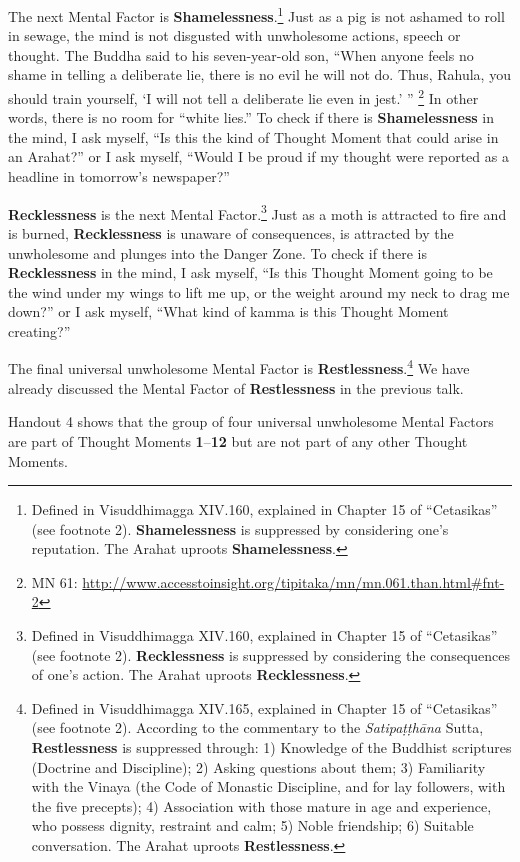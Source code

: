 The next Mental Factor is \textbf{Shamelessness}.\footnote{Defined in Visuddhimagga XIV.160, explained in Chapter 15 of “Cetasikas” (see footnote 2). \textbf{Shamelessness} is suppressed by considering one’s reputation. The Arahat uproots \textbf{Shamelessness}.} Just as a pig is not ashamed to roll in sewage, the mind is not disgusted with unwholesome actions, speech or thought. The Buddha said to his seven-year-old son, “When anyone feels no shame in telling a deliberate lie, there is no evil he will not do. Thus, Rahula, you should train yourself, `I will not tell a deliberate lie even in jest.’ ” \footnote{MN 61: \url{http://www.accesstoinsight.org/tipitaka/mn/mn.061.than.html\#fnt-2}} In other words, there is no room for “white lies.” To check if there is \textbf{Shamelessness} in the mind, I ask myself, “Is this the kind of Thought Moment that could arise in an Arahat?” or I ask myself, “Would I be proud if my thought were reported as a headline in tomorrow’s newspaper?”

\textbf{Recklessness} is the next Mental Factor.\footnote{Defined in Visuddhimagga XIV.160, explained in Chapter 15 of “Cetasikas” (see footnote 2). \textbf{Recklessness} is suppressed by considering the consequences of one’s action. The Arahat uproots \textbf{Recklessness}.} Just as a moth is attracted to fire and is burned, \textbf{Recklessness} is unaware of consequences, is attracted by the unwholesome and plunges into the Danger Zone. To check if there is \textbf{Recklessness} in the mind, I ask myself, “Is this Thought Moment going to be the wind under my wings to lift me up, or the weight around my neck to drag me down?” or I ask myself, “What kind of kamma is this Thought Moment creating?”

The final universal unwholesome Mental Factor is \textbf{Restlessness}.\footnote{Defined in Visuddhimagga XIV.165, explained in Chapter 15 of “Cetasikas” (see footnote 2). According to the commentary to the \textit{Satipaṭṭhāna} Sutta, \textbf{Restlessness} is suppressed through: 1) Knowledge of the Buddhist scriptures (Doctrine and Discipline); 2) Asking questions about them; 3) Familiarity with the Vinaya (the Code of Monastic Discipline, and for lay followers, with the five precepts); 4) Association with those mature in age and experience, who possess dignity, restraint and calm; 5) Noble friendship; 6) Suitable conversation. The Arahat uproots \textbf{Restlessness}.} We have already discussed the Mental Factor of \textbf{Restlessness} in the previous talk.

Handout 4 shows that the group of four universal unwholesome Mental Factors are part of Thought Moments \textbf{1}--\textbf{12} but are not part of any other Thought Moments.

